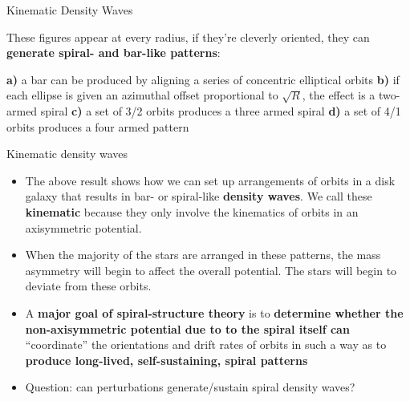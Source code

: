 \documentclass[letterpaper,landscape]{slides}
\begin{document}
\begin{slide}

\begin{center}
{\large \color{red} 
                 Kinematic Density Waves }
\end{center}

These figures appear at every radius, if they're cleverly oriented, they can
{\bf generate spiral- and bar-like patterns}:

\begin{center}
\end{center}

{\bf a)} a bar can be produced by aligning a series of concentric elliptical orbits
{\bf b)} if each ellipse is given an azimuthal offset proportional to $\sqrt{R}$, the effect is a two-armed spiral
{\bf c)} a set of 3/2 orbits produces a three armed spiral
{\bf d)} a set of 4/1 orbits produces a four armed pattern

\end{slide}


\begin{slide}

\begin{center}
{\large \color{red} 
                 Kinematic density waves }
\end{center}

\begin{itemize}

\item The above result shows how we can set up arrangements of orbits
in a disk galaxy that results in bar- or spiral-like {\bf density waves}.
We call these {\bf kinematic} because they only involve
the kinematics of orbits in an axisymmetric potential.

\item When the majority of the stars are arranged in these patterns,
the mass asymmetry will begin to affect the
overall potential. The stars will begin to deviate from these orbits.

\item A {\bf major goal of spiral-structure theory} is to {\bf determine whether
the non-axisymmetric potential due to to the spiral itself can} ``coordinate''
the orientations and drift rates of orbits in such a way as to {\bf produce
long-lived, self-sustaining, spiral patterns}

\item Question: can perturbations generate/sustain spiral density waves?

\end{itemize}

\vfill
\end{slide}
\end{document}
